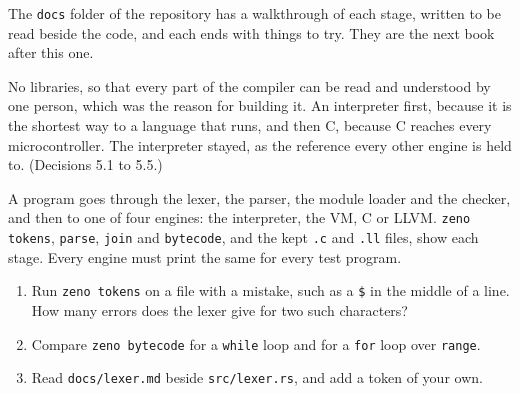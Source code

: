 The \verb|docs| folder of the repository has a walkthrough of each
stage, written to be read beside the code, and each ends with things to
try. They are the next book after this one.

\begin{why}
No libraries, so that every part of the compiler can be read and
understood by one person, which was the reason for building it. An
interpreter first, because it is the shortest way to a language that
runs, and then C, because C reaches every microcontroller. The
interpreter stayed, as the reference every other engine is held to.
(Decisions 5.1 to 5.5.)
\end{why}

\begin{summary}
A program goes through the lexer, the parser, the module loader and
the checker, and then to one of four engines: the interpreter, the VM,
C or LLVM. \verb|zeno tokens|, \verb|parse|, \verb|join| and
\verb|bytecode|, and the kept \verb|.c| and \verb|.ll| files, show each
stage. Every engine must print the same for every test program.
\end{summary}

\begin{tryit}
\begin{enumerate}
\item Run \verb|zeno tokens| on a file with a mistake, such as a
  \verb|$| in the middle of a line. How many errors does the lexer give
  for two such characters?
\item Compare \verb|zeno bytecode| for a \verb|while| loop and for a
  \verb|for| loop over \verb|range|.
\item Read \verb|docs/lexer.md| beside \verb|src/lexer.rs|, and add a
  token of your own.
\end{enumerate}
\end{tryit}
